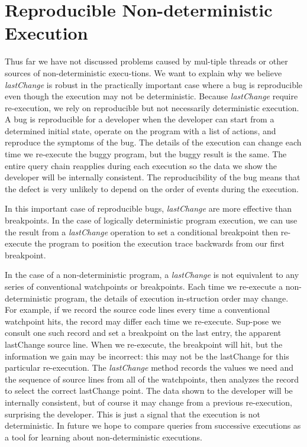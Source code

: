 \documentclass[preprint]{sigplanconf}
\begin{document}
\section{Reproducible Non-deterministic Execution}
Thus far we have not discussed problems caused by mul-tiple threads or other sources of non-deterministic execu-tions. We want to explain why we believe \textit{lastChange} is robust in the practically important case where a bug is reproducible even though the execution may not be deterministic. 
Because \textit{lastChange} require re-execution, we rely on reproducible but not necessarily deterministic execution. A bug is reproducible for a developer when the developer can start from a determined initial state, operate on the program with a list of actions, and reproduce the symptoms of the bug. The details of the execution can change each time we re-execute the buggy program, but the buggy result is the same. The entire query chain reapplies during each execution so the data we show the developer will be internally consistent. The reproducibility of the bug means that the defect is very unlikely to depend on the order of events during the execution.

In this important case of reproducible bugs, \textit{lastChange} are more effective than breakpoints. In the case of logically deterministic program execution, we can use the result from a \textit{lastChange} operation to set a conditional breakpoint then re-execute the program to position the execution trace backwards from our first breakpoint. %

In the case of a non-deterministic program, a \textit{lastChange} is not equivalent to any series of conventional watchpoints or breakpoints. Each time we re-execute a non-deterministic program, the details of execution in-struction order may change. For example, if we record the source code lines every time a conventional watchpoint hits, the record may differ each time we re-execute. Sup-pose we consult one such record and set a breakpoint on the last entry, the apparent lastChange source line. When we re-execute, the breakpoint will hit, but the information we gain may be incorrect: this may not be the lastChange for this particular re-execution. The \textit{lastChange} method records the values we need and the sequence of source lines from all of the watchpoints, then analyzes the record to select the correct lastChange point. The data shown to the developer will be internally consistent, but of course it may change from a previous re-execution, surprising the developer. This is just a signal that the execution is not deterministic. In future we hope to compare queries from successive executions as a tool for learning about non-deterministic executions.
\end{document}
